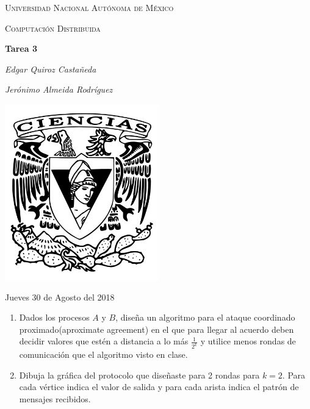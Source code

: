 \documentclass[12pt,a4paper]{report}
\begin{document}
\begin{titlepage}
	\centering
	{\scshape\LARGE Universidad Nacional Autónoma de México \par}
	\vspace{1cm}
	{\scshape\Large Computación Distribuida\par}
	\vspace{1.5cm}
	{\huge\bfseries Tarea 3\par}
	\vspace{.5cm}
	{\Large\itshape Edgar Quiroz Castañeda \par}
    \vspace{.5cm}
	{\Large\itshape Jerónimo Almeida Rodríguez \par}
	\vfill
	 \includegraphics[width=0.5\textwidth]{escudo_f-ciencias.png}
	\vfill

	{\large Jueves 30 de Agosto del 2018 \par}
\end{titlepage}

\pagebreak
\setlength{\voffset}{-0.75in}
\setlength{\headsep}{5pt}

\newcommand{\ed}[2]{(#1) edge (#2)}
\newcommand{\eee}[4]{\path [->,draw,thin] ($ (#1) !.5! (#2)$) -- ($ (#3) !.5! (#4) $);}


\begin{enumerate}
		\item {
		Dados los procesos $A$ y $B$, diseña un algoritmo para el ataque coordinado
		proximado(aproximate agreement) en el que para llegar al acuerdo deben decidir
		valores que estén a distancia a lo más $\frac{1}{2^k}$ y utilice menos rondas
		de comunicación que el algoritmo visto en clase.
	}
	\item {
		Dibuja la gráfica del protocolo que diseñaste para 2 rondas para $k = 2$.
		Para cada vértice indica el valor de salida y para cada arista indica el
		patrón de mensajes recibidos.
	}
\end{enumerate}
\end{document}
